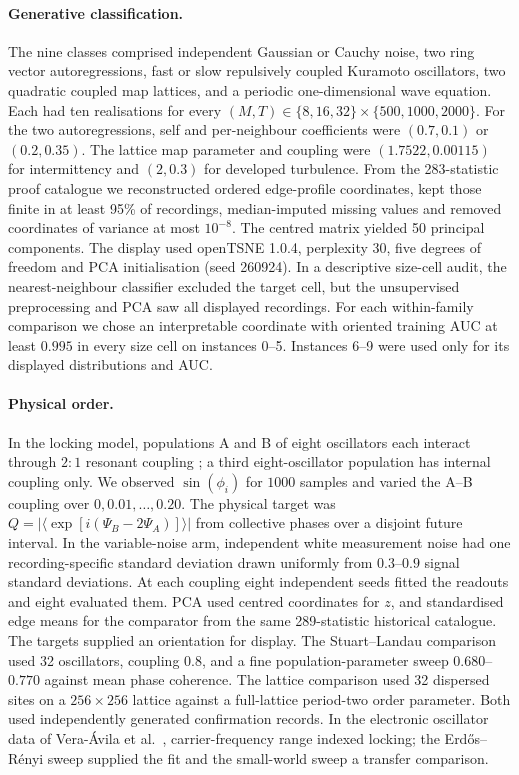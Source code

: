\paragraph{Generative classification.}
The nine classes comprised independent Gaussian or Cauchy noise, two ring vector autoregressions, fast or slow repulsively coupled Kuramoto oscillators, two quadratic coupled map lattices, and a periodic one-dimensional wave equation. Each had ten realisations for every $(M,T)\in\{8,16,32\}\times\{500,1000,2000\}$. For the two autoregressions, self and per-neighbour coefficients were $(0.7,0.1)$ or $(0.2,0.35)$. The lattice map parameter and coupling were $(1.7522,0.00115)$ for intermittency and $(2,0.3)$ for developed turbulence. From the 283-statistic proof catalogue we reconstructed ordered edge-profile coordinates, kept those finite in at least 95\% of recordings, median-imputed missing values and removed coordinates of variance at most $10^{-8}$. The centred matrix yielded 50 principal components. The display used openTSNE 1.0.4, perplexity 30, five degrees of freedom and PCA initialisation (seed 260924). In a descriptive size-cell audit, the nearest-neighbour classifier excluded the target cell, but the unsupervised preprocessing and PCA saw all displayed recordings. For each within-family comparison we chose an interpretable coordinate with oriented training AUC at least $0.995$ in every size cell on instances 0--5. Instances 6--9 were used only for its displayed distributions and AUC.

\paragraph{Physical order.}
In the locking model, populations A and B of eight oscillators each interact through $2{:}1$ resonant coupling \cite{komarov2015}; a third eight-oscillator population has internal coupling only. We observed $\sin(\phi_i)$ for $1000$ samples and varied the A--B coupling over $0,0.01,\ldots,0.20$. The physical target was $Q=|\langle\exp[i(\Psi_B-2\Psi_A)]\rangle|$ from collective phases over a disjoint future interval. In the variable-noise arm, independent white measurement noise had one recording-specific standard deviation drawn uniformly from $0.3$--$0.9$ signal standard deviations. At each coupling eight independent seeds fitted the readouts and eight evaluated them. PCA used centred coordinates for $z$, and standardised edge means for the comparator from the same 289-statistic historical catalogue. The targets supplied an orientation for display. The Stuart--Landau comparison used 32 oscillators, coupling $0.8$, and a fine population-parameter sweep $0.680$--$0.770$ against mean phase coherence. The lattice comparison used 32 dispersed sites on a $256\times256$ lattice against a full-lattice period-two order parameter. Both used independently generated confirmation records. In the electronic oscillator data of Vera-\'{A}vila et al.\ \cite{vera2026}, carrier-frequency range indexed locking; the Erd\H{o}s--R\'enyi sweep supplied the fit and the small-world sweep a transfer comparison.

